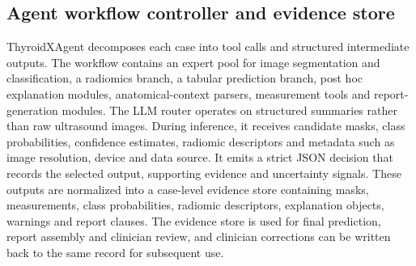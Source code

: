 \documentclass[fleqn,10pt]{wlscirep}
\begin{document}

\subsection{Agent workflow controller and evidence store}
ThyroidXAgent decomposes each case into tool calls and structured intermediate outputs. The workflow contains an expert pool for image segmentation and classification, a radiomics branch, a tabular prediction branch, post hoc explanation modules, anatomical-context parsers, measurement tools and report-generation modules. The LLM router operates on structured summaries rather than raw ultrasound images. During inference, it receives candidate masks, class probabilities, confidence estimates, radiomic descriptors and metadata such as image resolution, device and data source. It emits a strict JSON decision that records the selected output, supporting evidence and uncertainty signals. These outputs are normalized into a case-level evidence store containing masks, measurements, class probabilities, radiomic descriptors, explanation objects, warnings and report clauses. The evidence store is used for final prediction, report assembly and clinician review, and clinician corrections can be written back to the same record for subsequent use.
\end{document}
